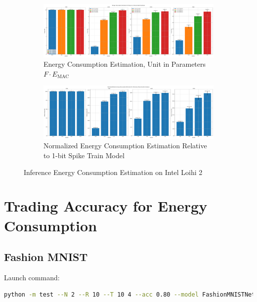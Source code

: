         \begin{figure}[H]
            \centering
            \begin{subfigure}[H]{\textwidth}
                \includegraphics[width=\textwidth]{../standard/CIFAR10/plots/cifar10_test_energy_nh.pdf}
                \caption{Energy Consumption Estimation, Unit in Parameters $F\cdot E_{\text{MAC}}$}
            \end{subfigure}
            \hfill
            \begin{subfigure}[H]{\textwidth}
                \includegraphics[width=\textwidth]{../standard/CIFAR10/plots/cifar10_test_relative_energy_nh.pdf}
                \caption{Normalized Energy Consumption Estimation Relative to 1-bit Spike Train Model}
            \end{subfigure}
            \caption{Inference Energy Consumption Estimation on Intel Loihi 2}
        \end{figure}

\section{Trading Accuracy for Energy Consumption}
\label{appendix:energy_tradeoff}

    \subsection{Fashion MNIST}
    \label{appendix:energy_tradeoff_fashion_mnist}
        Launch command: 
        \begin{lstlisting}[language=Bash, basicstyle=\small, breaklines=true]
python -m test --N 2 --R 10 --T 10 4 --acc 0.80 --model FashionMNISTNet --data-path /scratch/zyi/codeSpace/data --dataset FashionMNIST --batch-size 128 --opt adam --lr 2e-3 --lr-scheduler none --epochs 5 --lr-warmup-epochs 0 --output-dir /scratch/zyi/codeSpace/MultibitSpikes/timesteps --mixup-alpha 0.0 --cutmix-alpha 0.0 --label-smoothing 0.0 --disable-amp
        \end{lstlisting}

